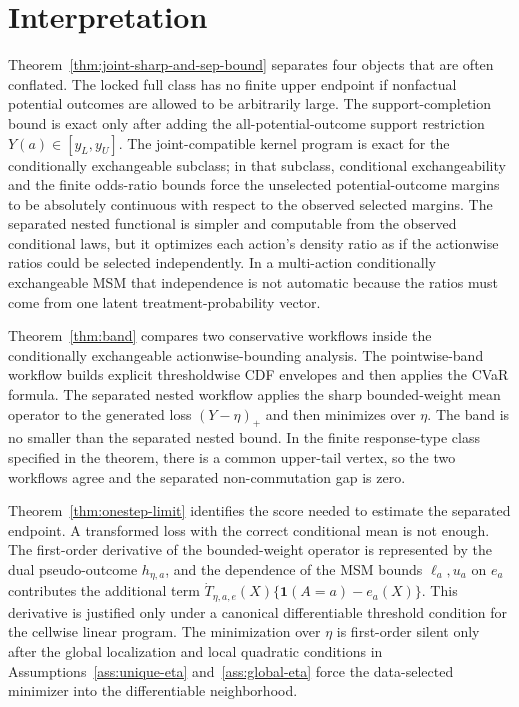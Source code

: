 \documentclass[11pt]{article}
\newcommand{\one}{\mathbf{1}}
\theoremstyle{definition}
\theoremstyle{plain}
\theoremstyle{remark}
\begin{document}
\section{Interpretation}
Theorem~\ref{thm:joint-sharp-and-sep-bound} separates four objects that are
often conflated.  The locked full class has no finite upper endpoint if
nonfactual potential outcomes are allowed to be arbitrarily large.  The
support-completion bound is exact only after adding the all-potential-outcome
support restriction \(Y(a)\in[y_L,y_U]\).  The joint-compatible kernel program
is exact for the conditionally exchangeable subclass; in that subclass,
conditional exchangeability and the finite odds-ratio bounds force the
unselected potential-outcome margins to be absolutely continuous with respect to
the observed selected margins.  The separated nested functional is simpler and
computable from the observed conditional laws, but it optimizes each action's
density ratio as if the actionwise ratios could be selected independently.  In a
multi-action conditionally exchangeable MSM that independence is not automatic
because the ratios must come from one latent treatment-probability vector.

Theorem~\ref{thm:band} compares two conservative workflows inside the
conditionally exchangeable actionwise-bounding analysis.  The pointwise-band
workflow builds explicit thresholdwise CDF envelopes and then applies the CVaR
formula.  The separated nested workflow applies the sharp bounded-weight mean
operator to the generated loss \((Y-\eta)_+\) and then minimizes over \(\eta\).
The band is no smaller than the separated nested bound.  In the finite
response-type class specified in the theorem, there is a common upper-tail
vertex, so the two workflows agree and the separated non-commutation gap is
zero.

Theorem~\ref{thm:onestep-limit} identifies the score needed to estimate the
separated endpoint.  A transformed loss with the correct conditional mean is not
enough.  The first-order derivative of the bounded-weight operator is represented
by the dual pseudo-outcome \(h_{\eta,a}\), and the dependence of the MSM bounds
\(\ell_a,u_a\) on \(e_a\) contributes the additional term
\(\dot T_{\eta,a,e}(X)\{\one(A=a)-e_a(X)\}\).  This derivative is justified only
under a canonical differentiable threshold condition for the cellwise linear
program.  The minimization over \(\eta\) is first-order silent only after the
global localization and local quadratic conditions in
Assumptions~\ref{ass:unique-eta} and~\ref{ass:global-eta} force the
data-selected minimizer into the differentiable neighborhood.
\end{document}
